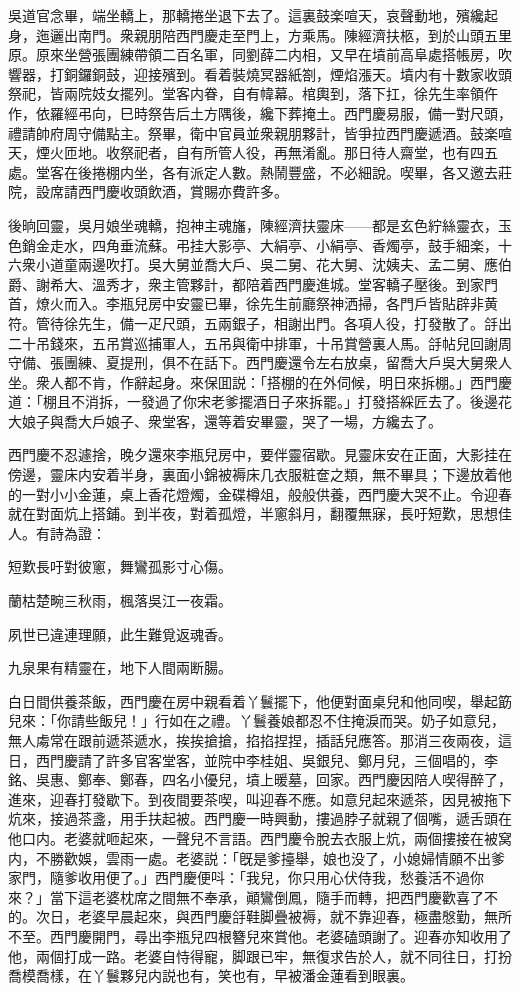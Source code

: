 吳道官念畢，端坐轎上，那轎捲坐退下去了。這裏鼓楽喧天，哀聲動地，殯纔起身，迤邐出南門。衆親朋陪西門慶走至門上，方乘馬。陳經濟扶柩，到於山頭五里原。原來坐營張團練帶領二百名軍，同劉薛二内相，又早在墳前高阜處搭帳房，吹響器，打銅鑼銅鼓，迎接殯到。看着裝燒冥器紙劄，煙焰漲天。墳内有十數家收頭祭祀，皆兩院妓女擺列。堂客内眷，自有幃幕。棺輿到，落下扛，徐先生率領仵作，依羅經弔向，巳時祭告后土方隅後，纔下葬掩土。西門慶易服，備一對尺頭，禮請帥府周守備點主。祭畢，衛中官員並衆親朋夥計，皆爭拉西門慶遞酒。鼓楽喧天，煙火匝地。收祭祀者，自有所管人役，再無淆亂。那日待人齋堂，也有四五處。堂客在後捲棚内坐，各有派定人數。熱鬧豐盛，不必細說。喫畢，各又邀去莊院，設席請西門慶收頭飲酒，賞賜亦費許多。

後晌回靈，吳月娘坐魂轎，抱神主魂旛，陳經濟扶靈床——都是玄色紵絲靈衣，玉色銷金走水，四角垂流蘇。弔挂大影亭、大絹亭、小絹亭、香燭亭，鼓手細楽，十六衆小道童兩邊吹打。吳大舅並喬大戶、吳二舅、花大舅、沈姨夫、孟二舅、應伯爵、謝希大、溫秀才，衆主管夥計，都陪着西門慶進城。堂客轎子壓後。到家門首，燎火而入。李瓶兒房中安靈已畢，徐先生前廳祭神洒掃，各門戶皆貼辟非黄符。管待徐先生，備一疋尺頭，五兩銀子，相謝出門。各項人役，打發散了。㧱出二十吊錢來，五吊賞巡捕軍人，五吊與衛中排軍，十吊賞營裏人馬。㧱帖兒回謝周守備、張團練、夏提刑，俱不在話下。西門慶還令左右放桌，留喬大戶吳大舅衆人坐。衆人都不肯，作辭起身。來保囬説：「搭棚的在外伺候，明日來拆棚。」西門慶道：「棚且不消拆，一發過了你宋老爹擺酒日子來拆罷。」打發搭綵匠去了。後邊花大娘子與喬大戶娘子、衆堂客，還等着安畢靈，哭了一場，方纔去了。

西門慶不忍遽捨，晚夕還來李瓶兒房中，要伴靈宿歇。見靈床安在正面，大影挂在傍邊，靈床内安着半身，裏面小錦被褥床几衣服粧奩之類，無不畢具；下邊放着他的一對小小金蓮，桌上香花燈燭，金碟樽俎，般般供養，西門慶大哭不止。令迎春就在對面炕上搭鋪。到半夜，對着孤燈，半窻斜月，翻覆無寐，長吁短歎，思想佳人。有詩為證：

\begin{myquote}
短歎長吁對彼窻，舞鸞孤影寸心傷。

蘭枯楚畹三秋雨，楓落吳江一夜霜。

夙世已違連理願，此生難覓返魂香。

九泉果有精靈在，地下人間兩断腸。
\end{myquote}

白日間供養茶飯，西門慶在房中親看着丫鬟擺下，他便對面桌兒和他同喫，舉起筯兒來：「你請些飯兒！」行如在之禮。丫鬟養娘都忍不住掩淚而哭。奶子如意兒，無人䖏常在跟前遞茶遞水，挨挨搶搶，掐掐捏捏，插話兒應答。那消三夜兩夜，這日，西門慶請了許多官客堂客，並院中李桂姐、吳銀兒、鄭月兒，三個唱的，李銘、吳惠、鄭奉、鄭春，四名小優兒，墳上暖墓，回家。西門慶因陪人喫得醉了，進來，迎春打發歇下。到夜間要茶喫，叫迎春不應。如意兒起來遞茶，因見被拖下炕來，接過茶盞，用手扶起被。西門慶一時興動，摟過脖子就親了個嘴，遞舌頭在他口内。老婆就咂起來，一聲兒不言語。西門慶令脫去衣服上炕，兩個摟接在被窝内，不勝歡娛，雲雨一處。老婆説：「旣是爹擡舉，娘也没了，小媳婦情願不出爹家門，隨爹收用便了。」西門慶便呌：「我兒，你只用心伏侍我，愁養活不過你來？」當下這老婆枕席之間無不奉承，顚鸞倒鳳，隨手而轉，把西門慶歡喜了不的。次日，老婆早晨起來，與西門慶㧱鞋脚疊被褥，就不靠迎春，極盡慇勤，無所不至。西門慶開門，尋出李瓶兒四根簪兒來賞他。老婆磕頭謝了。迎春亦知收用了他，兩個打成一路。老婆自恃得寵，脚跟已牢，無復求告於人，就不同往日，打扮喬模喬樣，在丫鬟夥兒内説也有，笑也有，早被潘金蓮看到眼裏。


